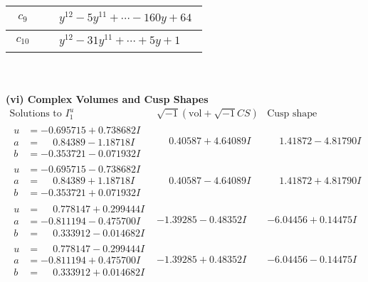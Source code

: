 \documentclass[1p]{elsarticle_modified}
\theoremstyle{definition}
\newcommand{\I}{\sqrt{-1}}
\begin{document}
\begin{tabular}{m{50pt}|m{274pt}}
\hline $$\begin{aligned}c_{9}\end{aligned}$$&$\begin{aligned}
&y^{12}-5 y^{11}+\cdots-160 y+64
\end{aligned}$\\
\hline $$\begin{aligned}c_{10}\end{aligned}$$&$\begin{aligned}
&y^{12}-31 y^{11}+\cdots+5 y+1
\end{aligned}$\\
\hline
\end{tabular}\\~\\
\newpage\flushleft \textbf{(vi) Complex Volumes and Cusp Shapes}
$$\begin{array}{c|c|c}  
\text{Solutions to }I^u_{1}& \I (\text{vol} + \sqrt{-1}CS) & \text{Cusp shape}\\
 \hline 
\begin{aligned}
u &= -0.695715 + 0.738682 I \\
a &= \phantom{-}0.84389 - 1.18718 I \\
b &= -0.353721 - 0.071932 I\end{aligned}
 & \phantom{-}0.40587 + 4.64089 I & \phantom{-}1.41872 - 4.81790 I \\ \hline\begin{aligned}
u &= -0.695715 - 0.738682 I \\
a &= \phantom{-}0.84389 + 1.18718 I \\
b &= -0.353721 + 0.071932 I\end{aligned}
 & \phantom{-}0.40587 - 4.64089 I & \phantom{-}1.41872 + 4.81790 I \\ \hline\begin{aligned}
u &= \phantom{-}0.778147 + 0.299444 I \\
a &= -0.811194 - 0.475700 I \\
b &= \phantom{-}0.333912 - 0.014682 I\end{aligned}
 & -1.39285 - 0.48352 I & -6.04456 + 0.14475 I \\ \hline\begin{aligned}
u &= \phantom{-}0.778147 - 0.299444 I \\
a &= -0.811194 + 0.475700 I \\
b &= \phantom{-}0.333912 + 0.014682 I\end{aligned}
 & -1.39285 + 0.48352 I & -6.04456 - 0.14475 I \\ \hline\begin{aligned}

\end{aligned}
\end{array}$$
\end{document}
